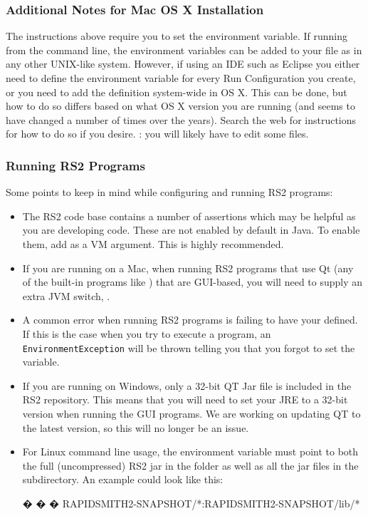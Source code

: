 \subsubsection{Additional Notes for Mac OS X Installation}

The instructions above require you to set the 
environment variable.  If running from the command line, the environment
variables can be added to your  file as in any other
UNIX-like system.  However, if using an IDE such as Eclipse you either need to
define the environment variable for every Run Configuration you create, or you
need to add the  definition system-wide in OS X. This can
be done, but how to do so differs based on what OS X version you are running
(and seems to have changed a number of times over the years). Search the web for
instructions for how to do so if you desire. : you will likely have
to edit some  files.

\subsubsection{Running RS2 Programs}
Some points to keep in mind while configuring and running RS2 programs:
\begin{itemize}
  \item The RS2 code base contains a number of assertions which may be helpful  
  as you are developing code.  These are not enabled by default in Java.  To
  enable them, add  as a VM argument.  This is highly recommended.
  \item If you are running on a Mac, when running RS2 programs that use Qt  (any
  of the built-in programs like ) that are GUI-based, you
  will need to supply an extra JVM switch, .
  \item A common error when running RS2 programs is failing to have your
   defined.  If this is the case when you try to execute a
  program, an \texttt{EnvironmentException} will be thrown telling you that you
  forgot to set the variable.
  \item If you are running on Windows, only a 32-bit QT Jar file is included in
  the RS2 repository. This means that you will need to set your JRE to a 32-bit
  version when running the GUI programs. We are working on updating QT to the
  latest version, so this will no longer be an issue.
  \item For Linux command line usage, the  environment variable
  must point to both the full (uncompressed) RS2 jar in the 
  folder as well as all the jar files in the  subdirectory. An example
   could look like this:
  \vspace{-0.15in}  \begin{code}
  �  �  � RAPIDSMITH2-SNAPSHOT/*:RAPIDSMITH2-SNAPSHOT/lib/*
  \end{code}
\end{itemize}

